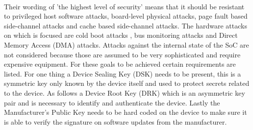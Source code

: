 \paragraph*{}
Their wording of 'the highest level of security' means that it should be resistant to privileged host software attacks, board-level physical attacks, page fault based side-channel attacks and cache based side-channel attacks. The hardware attacks on which is focused are cold boot attacks \cite{HuberManuel2016Afff}, bus monitoring attacks \cite{TPMGenie} and Direct Memory Access (DMA) attacks. Attacks against the internal state of the SoC are not considered because those are assumed to be very sophisticated and require expensive equipment. For these goals to be achieved certain requirements are listed. For one thing a Device Sealing Key (DSK) needs to be present, this is a symmetric key only known by the device itself and used to protect secrets related to the device. As follows a Device Root Key (DRK) which is an asymmetric key pair and is necessary to identify and authenticate the device. Lastly the Manufacturer's Public Key needs to be hard coded on the device to make sure it is able to verify the signature on software updates from the manufacturer. 

